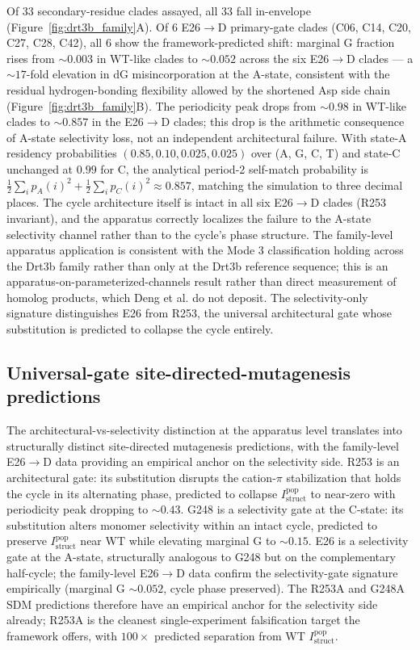 \documentclass[aps,prx,reprint,amsmath,amssymb,floatfix,superscriptaddress,nofootinbib]{revtex4-2}
\theoremstyle{plain-thm}
\theoremstyle{definition-thm}
\newcommand{\Istructpop}{I_{\mathrm{struct}}^{\mathrm{pop}}}
\begin{document}
Of 33 secondary-residue clades assayed, all 33 fall in-envelope (Figure~\ref{fig:drt3b_family}A). Of 6 E26$\to$D primary-gate clades (C06, C14, C20, C27, C28, C42), all 6 show the framework-predicted shift: marginal G fraction rises from $\sim 0.003$ in WT-like clades to $\sim 0.052$ across the six E26$\to$D clades --- a $\sim 17$-fold elevation in dG misincorporation at the A-state, consistent with the residual hydrogen-bonding flexibility allowed by the shortened Asp side chain (Figure~\ref{fig:drt3b_family}B). The periodicity peak drops from $\sim 0.98$ in WT-like clades to $\sim 0.857$ in the E26$\to$D clades; this drop is the arithmetic consequence of A-state selectivity loss, not an independent architectural failure. With state-A residency probabilities $(0.85, 0.10, 0.025, 0.025)$ over (A, G, C, T) and state-C unchanged at $0.99$ for C, the analytical period-2 self-match probability is $\frac{1}{2}\sum_i p_A(i)^2 + \frac{1}{2}\sum_i p_C(i)^2 \approx 0.857$, matching the simulation to three decimal places. The cycle architecture itself is intact in all six E26$\to$D clades (R253 invariant), and the apparatus correctly localizes the failure to the A-state selectivity channel rather than to the cycle's phase structure. The family-level apparatus application is consistent with the Mode 3 classification holding across the Drt3b family rather than only at the Drt3b reference sequence; this is an apparatus-on-parameterized-channels result rather than direct measurement of homolog products, which Deng et al. do not deposit. The selectivity-only signature distinguishes E26 from R253, the universal architectural gate whose substitution is predicted to collapse the cycle entirely.

\subsection{Universal-gate site-directed-mutagenesis predictions}

The architectural-vs-selectivity distinction at the apparatus level translates into structurally distinct site-directed mutagenesis predictions, with the family-level E26$\to$D data providing an empirical anchor on the selectivity side. R253 is an architectural gate: its substitution disrupts the cation-$\pi$ stabilization that holds the cycle in its alternating phase, predicted to collapse $\Istructpop$ to near-zero with periodicity peak dropping to $\sim 0.43$. G248 is a selectivity gate at the C-state: its substitution alters monomer selectivity within an intact cycle, predicted to preserve $\Istructpop$ near WT while elevating marginal G to $\sim 0.15$. E26 is a selectivity gate at the A-state, structurally analogous to G248 but on the complementary half-cycle; the family-level E26$\to$D data confirm the selectivity-gate signature empirically (marginal G $\sim 0.052$, cycle phase preserved). The R253A and G248A SDM predictions therefore have an empirical anchor for the selectivity side already; R253A is the cleanest single-experiment falsification target the framework offers, with $100\times$ predicted separation from WT $\Istructpop$.
\end{document}
